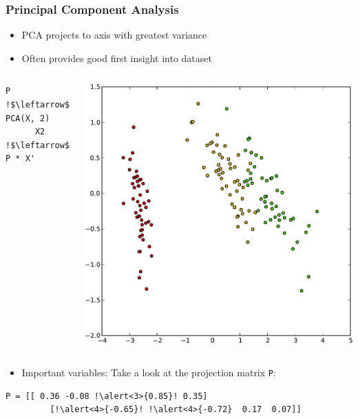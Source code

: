 \begin{frame}[fragile]
  \frametitle{Principal Component Analysis}
  \begin{itemize}
  \item PCA projects to axis with greatest \alert{variance}
  \item Often provides good \alert{first insight} into dataset
  \end{itemize}

  \begin{columns}
    \begin{lstlisting}[escapechar=!]
      P !$\leftarrow$! PCA(X, 2)
      X2 !$\leftarrow$! P * X'
    \end{lstlisting}
    \includegraphics[width=.99\linewidth]{pca-pics/iris-2d}
  \end{columns}

  \pause
  \begin{itemize}
  \item Important variables: Take a look at the projection matrix \verb+P+:
  \end{itemize}

  \begin{lstlisting}[escapechar=!]
    P = [[ 0.36 -0.08 !\alert<3>{0.85}! 0.35]
         [!\alert<4>{-0.65}! !\alert<4>{-0.72}  0.17  0.07]]
  \end{lstlisting}
\end{frame}

